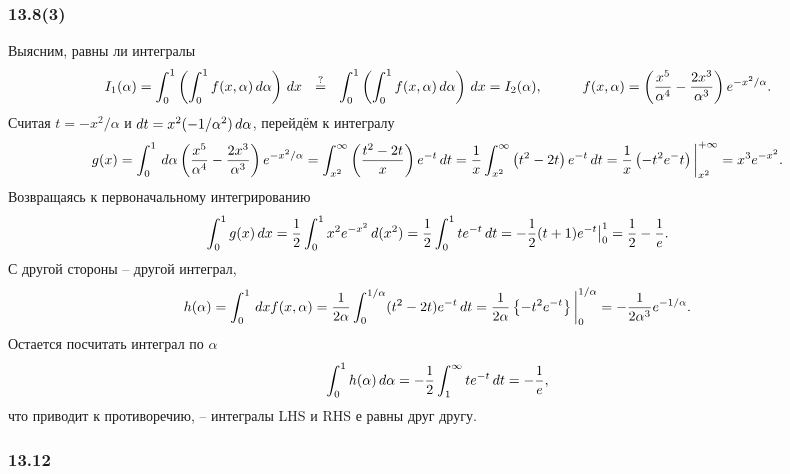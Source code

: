 \subsubsection*{13.8(3)}


Выясним, равны ли интегралы
\begin{equation*}
    I_1 (\alpha) = \int_0^1 \l(
        \int_0^1 f(x, \alpha) \d \alpha
    \r) \d x 
    \ \ \overset{?}{=} \ \ 
     \int_0^1 \l(
        \int_0^1  f(x, \alpha) \d \alpha
    \r) \d x = I_2(\alpha),
    \hspace{10 mm}
    f(x, \alpha) = \l(
        \frac{x^5}{\alpha^4} - \frac{2 x^3}{\alpha^3}
    \r) e^{-x^2/\alpha}.
\end{equation*}
Считая $t = - x^2/\alpha$ и $d t = x^2 (-1/\alpha^2) \, d \alpha$, перейдём к интегралу
\begin{equation*}
    g(x) = \int_0^1 \, d \alpha \left(
        \frac{x^5}{\alpha^4} - \frac{2x^3}{\alpha^3}
    \right) e^{-x^2/\alpha} = \int_{x^2}^{\infty} \left(
        \frac{t^2-2t}{x}
    \right) e^{-t} \, d t = \frac{1}{x} \int_{x^2}^{\infty} \left(
        t^2 - 2t
    \right) e^{-t} \, d t = \frac{1}{x} \left(
        - t^2 e^-t
    \right) \bigg|_{x^2}^{+\infty} = x^3 e^{-x^2}.
\end{equation*}
Возвращаясь к первоначальному интегрированию
\begin{equation*}
    \int_0^1 g(x) \, d x = \frac{1}{2} \int_0^1 x^2 e^{-x^2} \, d (x^2) = 
    \frac{1}{2} \int_0^1 t e^{-t} \, d t = - \frac{1}{2} (t+1) e^{-t} \big|_0^1 = \frac{1}{2}-\frac{1}{e}.
\end{equation*}
С другой стороны -- другой интеграл,
\begin{equation*}
    h(\alpha) = \int_0^1 \, d x f(x, \alpha) = \frac{1}{2\alpha} \int_0^{1/\alpha} (t^2 - 2t) e^{-t} \, d t = \frac{1}{2\alpha} \left\{
        - t^2 e^{-t}
    \right\}\bigg|^{1/\alpha}_0 = - \frac{1}{2\alpha^3} e^{-1/\alpha}.
\end{equation*}
Остается посчитать интеграл по $\alpha$ 
\begin{equation*}
    \int_0^1 h(\alpha) \, d \alpha = - \frac{1}{2} \int_1^{\infty} t e^{-t} \, d t = - \frac{1}{e},
\end{equation*}
что приводит к противоречию, -- интегралы LHS и RHS е равны друг другу.



\subsubsection*{13.12}


